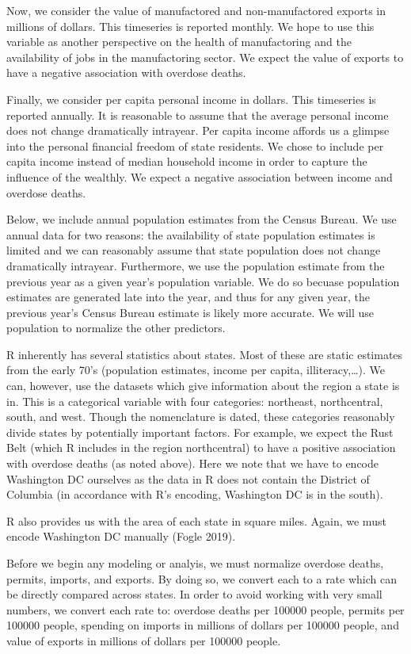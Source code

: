 \documentclass[]{article}
\begin{document}
Now, we consider the value of manufactored and non-manufactored exports
in millions of dollars. This timeseries is reported monthly. We hope to
use this variable as another perspective on the health of manufactoring
and the availability of jobs in the manufactoring sector. We expect the
value of exports to have a negative association with overdose deaths.

Finally, we consider per capita personal income in dollars. This
timeseries is reported annually. It is reasonable to assume that the
average personal income does not change dramatically intrayear. Per
capita income affords us a glimpse into the personal financial freedom
of state residents. We chose to include per capita income instead of
median household income in order to capture the influence of the
wealthly. We expect a negative association between income and overdose
deaths.

Below, we include annual population estimates from the Census Bureau. We
use annual data for two reasons: the availability of state population
estimates is limited and we can reasonably assume that state population
does not change dramatically intrayear. Furthermore, we use the
population estimate from the previous year as a given year's population
variable. We do so becuase population estimates are generated late into
the year, and thus for any given year, the previous year's Census Bureau
estimate is likely more accurate. We will use population to normalize
the other predictors.

R inherently has several statistics about states. Most of these are
static estimates from the early 70's (population estimates, income per
capita, illiteracy,\ldots{}). We can, however, use the datasets which
give information about the region a state is in. This is a categorical
variable with four categories: northeast, northcentral, south, and west.
Though the nomenclature is dated, these categories reasonably divide
states by potentially important factors. For example, we expect the Rust
Belt (which R includes in the region northcentral) to have a positive
association with overdose deaths (as noted above). Here we note that we
have to encode Washington DC ourselves as the data in R does not contain
the District of Columbia (in accordance with R's encoding, Washington DC
is in the south).

R also provides us with the area of each state in square miles. Again,
we must encode Washington DC manually (Fogle 2019).

Before we begin any modeling or analyis, we must normalize overdose
deaths, permits, imports, and exports. By doing so, we convert each to a
rate which can be directly compared across states. In order to avoid
working with very small numbers, we convert each rate to: overdose
deaths per 100000 people, permits per 100000 people, spending on imports
in millions of dollars per 100000 people, and value of exports in
millions of dollars per 100000 people.
\end{document}
